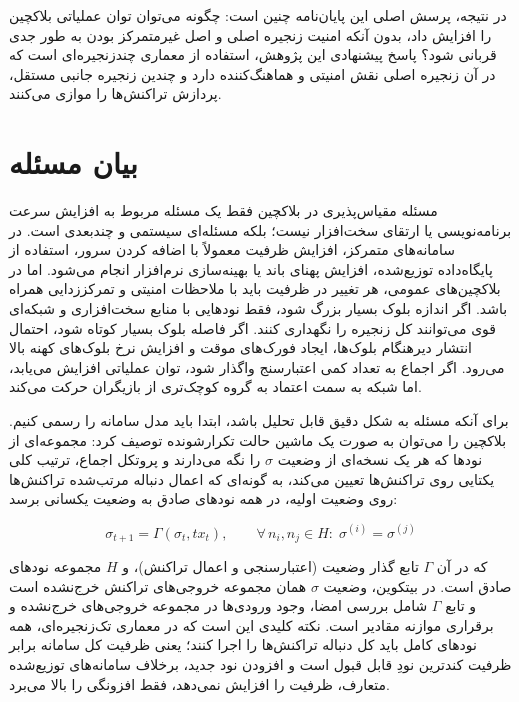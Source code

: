 در نتیجه، پرسش اصلی این پایان‌نامه چنین است: چگونه می‌توان توان عملیاتی بلاکچین را افزایش داد، بدون آنکه امنیت زنجیره اصلی و اصل غیرمتمرکز بودن به طور جدی قربانی شود؟ پاسخ پیشنهادی این پژوهش، استفاده از معماری چندزنجیره‌ای است که در آن زنجیره اصلی نقش امنیتی و هماهنگ‌کننده دارد و چندین زنجیره جانبی مستقل، پردازش تراکنش‌ها را موازی می‌کنند.

\section{بیان مسئله}

مسئله مقیاس‌پذیری در بلاکچین فقط یک مسئله مربوط به افزایش سرعت برنامه‌نویسی یا ارتقای سخت‌افزار نیست؛ بلکه مسئله‌ای سیستمی و چندبعدی است. در سامانه‌های متمرکز، افزایش ظرفیت معمولاً با اضافه کردن سرور، استفاده از پایگاه‌داده توزیع‌شده، افزایش پهنای باند یا بهینه‌سازی نرم‌افزار انجام می‌شود. اما در بلاکچین‌های عمومی، هر تغییر در ظرفیت باید با ملاحظات امنیتی و تمرکززدایی همراه باشد. اگر اندازه بلوک بسیار بزرگ شود، فقط نودهایی با منابع سخت‌افزاری و شبکه‌ای قوی می‌توانند کل زنجیره را نگهداری کنند. اگر فاصله بلوک بسیار کوتاه شود، احتمال انتشار دیرهنگام بلوک‌ها، ایجاد فورک‌های موقت و افزایش نرخ بلوک‌های کهنه بالا می‌رود. اگر اجماع به تعداد کمی اعتبارسنج واگذار شود، توان عملیاتی افزایش می‌یابد، اما شبکه به سمت اعتماد به گروه کوچک‌تری از بازیگران حرکت می‌کند.

برای آنکه مسئله به شکل دقیق قابل تحلیل باشد، ابتدا باید مدل سامانه را رسمی کنیم. بلاکچین را می‌توان به صورت یک ماشین حالت تکرارشونده توصیف کرد: مجموعه‌ای از نودها که هر یک نسخه‌ای از وضعیت \(\sigma\) را نگه می‌دارند و پروتکل اجماع، ترتیب کلی یکتایی روی تراکنش‌ها تعیین می‌کند، به گونه‌ای که اعمال دنباله مرتب‌شده تراکنش‌ها روی وضعیت اولیه، در همه نودهای صادق به وضعیت یکسانی برسد:

\begin{latin}
\[
\sigma_{t+1} = \Gamma(\sigma_t, tx_t), \qquad \forall\, n_i, n_j \in H:\; \sigma^{(i)} = \sigma^{(j)}
\]
\end{latin}

که در آن \(\Gamma\) تابع گذار وضعیت (اعتبارسنجی و اعمال تراکنش)، و \(H\) مجموعه نودهای صادق است. در بیتکوین، وضعیت \(\sigma\) همان مجموعه خروجی‌های تراکنش خرج‌نشده است و تابع \(\Gamma\) شامل بررسی امضا، وجود ورودی‌ها در مجموعه خروجی‌های خرج‌نشده و برقراری موازنه مقادیر است. نکته کلیدی این است که در معماری تک‌زنجیره‌ای، همه نودهای کامل باید کل دنباله تراکنش‌ها را اجرا کنند؛ یعنی ظرفیت کل سامانه برابر ظرفیت کندترین نودِ قابل قبول است و افزودن نود جدید، برخلاف سامانه‌های توزیع‌شده متعارف، ظرفیت را افزایش نمی‌دهد، فقط افزونگی را بالا می‌برد.

